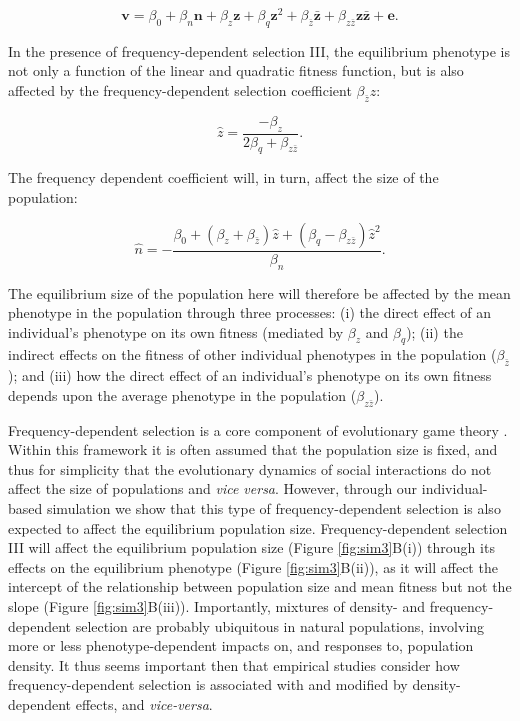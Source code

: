 \documentclass{article}
\begin{document}
\begin{equation} \label{eq: FDS}
\bm{v}=\beta_{0} +\beta_{n} \bm{n} + \beta_{z} \bm{z} + \beta_{q} \bm{z}^2 +   \beta_{\bar{z}} \bm{\bar{z}}  + \beta_{z\bar{z}} \bm{z\bar{z}}  +  \bm{e}.
\end{equation}

\noindent In the presence of frequency-dependent selection III, the equilibrium phenotype is not only a function of the linear and quadratic fitness function, but is also affected by the frequency-dependent selection coefficient $\beta_{\bar{z}}z$:

\begin{equation} 
\hat{z}=\frac{-\beta_{z}}{2\beta_{q} + \beta_{z\bar{z}}}.
\end{equation} 

\noindent The frequency dependent coefficient will, in turn, affect the size of the population:

\begin{equation}
\hat{n} = -\frac{\beta_{0}+ (\beta_{z}   + \beta_{\bar{z}})\hat{z} + (\beta_{q} - \beta_{z\bar{z}})\hat{z}^2}{\beta_{n}}.
\end{equation}

\noindent The equilibrium size of the population here will therefore be affected by the mean phenotype in the population through three processes: (i) the direct effect of an individual's phenotype on its own fitness (mediated by $\beta_z$ and $ \beta_q$); (ii) the indirect effects on the fitness of other individual phenotypes in the population ($\beta_{\bar{z}}$); and (iii) how the direct effect of an individual's phenotype on its own fitness depends upon the average phenotype in the population ($\beta_{z\bar{z}}$). 
 
 Frequency-dependent selection is a core component of evolutionary game theory \citep{MaynardSmith1982}. Within this framework it is often assumed that the population size is fixed, and thus for simplicity that the evolutionary dynamics of social interactions do not affect the size of populations and  \textit{vice versa}. However, through our individual-based simulation we show that this type of frequency-dependent selection is also expected to affect the equilibrium population size. Frequency-dependent selection III will affect the equilibrium population size (Figure \ref{fig:sim3}B(i)) through its effects on the equilibrium phenotype (Figure \ref{fig:sim3}B(ii)), as it will affect the intercept of the relationship between population size and mean fitness but not the slope (Figure \ref{fig:sim3}B(iii)). Importantly, mixtures of density- and frequency-dependent selection are probably ubiquitous in natural populations, involving more or less phenotype-dependent impacts on, and responses to, population density. It thus seems important then that empirical studies consider how frequency-dependent selection is associated with and modified by density-dependent effects, and \textit{vice-versa}.
\end{document}
